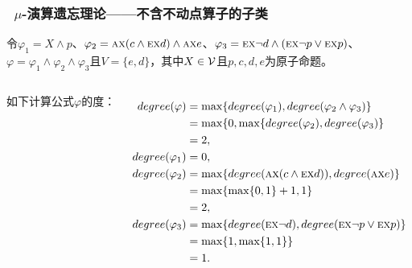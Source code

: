 \documentclass[9pt, CJK]{beamer}
\begin{document}
\begin{frame} 
	\frametitle{~$\mu$-演算遗忘理论——{\footnotesize 不含不动点算子的子类}}
{\tiny	\begin{example}
		\label{exp:x-class}
		令$\varphi_1 = X \wedge p$、$\varphi_2 = \textsc{a}\textsc{x}(c \wedge \textsc{e}\textsc{x} d) \wedge \textsc{a}\textsc{x} e$、$\varphi_3 = \textsc{e}\textsc{x} \neg d \wedge (\textsc{e}\textsc{x} \neg p \vee \textsc{e}\textsc{x} p)$、$\varphi = \varphi_1 \wedge \varphi_2 \wedge \varphi_3$且$V = \{e,d\}$，其中$X \in {\cal V}$且$p, c, d, e$为原子命题。 
		\begin{columns}
			
		如下计算公式$\varphi$的度：
		
		\begin{align*}
			degree(\varphi) &  =  \max\{degree(\varphi_1), degree(\varphi_2 \wedge \varphi_3)\}\\
			& = \max\{0, \max\{degree(\varphi_2), degree(\varphi_3)\}\\
			& = 2,\\
			degree(\varphi_1) & = 0,\\
			degree(\varphi_2) & = \max\{degree(\textsc{a}\textsc{x}(c \wedge \textsc{e}\textsc{x} d)), degree(\textsc{a}\textsc{x} e)\}\\
			& =\max\{\max\{0, 1\} + 1, 1\}\\
			& = 2,\\
			degree(\varphi_3) & = \max\{degree(\textsc{e}\textsc{x} \neg d), degree(\textsc{e}\textsc{x} \neg p \vee \textsc{e}\textsc{x} p)\}\\
			& = \max\{1, \max\{1,1\}\}\\
			& = 1.
		\end{align*}
		

\end{columns}
\end{example}}
\end{frame}
\end{document}
